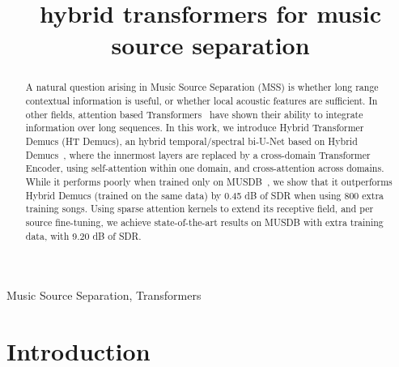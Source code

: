 \documentclass{article}
\title{hybrid transformers for music source separation}
\begin{document}
%
\maketitle
%
\begin{abstract}
A natural question arising in Music Source Separation (MSS) is whether long range contextual information is useful,
or whether local acoustic features are sufficient.
In other fields, attention based Transformers~\cite{transformer} have shown their ability to integrate
information over long sequences. In this work, we introduce Hybrid Transformer Demucs (HT Demucs), 
an hybrid temporal/spectral bi-U-Net based on Hybrid Demucs~\cite{defossez2021hybrid}, 
where the innermost layers are replaced by a cross-domain Transformer Encoder, 
using self-attention within one domain, and cross-attention across domains.
While it performs poorly when trained only on MUSDB~\cite{musdb}, we show that it outperforms Hybrid Demucs (trained on the same data) by 0.45 dB of SDR when using 800 extra training songs.
Using sparse attention kernels to extend its receptive field, and per source fine-tuning, 
we achieve state-of-the-art results on MUSDB with extra training data, with 9.20 dB of SDR.

\end{abstract}
%
\begin{keywords}
Music Source Separation, Transformers
\end{keywords}
%
\section{Introduction}
\label{sec:intro}
\end{document}
